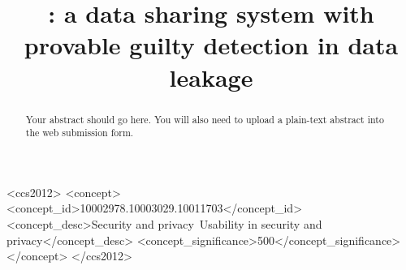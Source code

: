 \documentclass[sigconf, anonymous]{acmart}
\begin{document}
\title{\name: a data sharing system with provable guilty detection in data leakage} %

\begin{abstract}
Your abstract should go here. You will also need to upload a plain-text abstract into the web submission form.
\end{abstract}

\begin{CCSXML}
<ccs2012>
<concept>
<concept_id>10002978.10003029.10011703</concept_id>
<concept_desc>Security and privacy~Usability in security and privacy</concept_desc>
<concept_significance>500</concept_significance>
</concept>
</ccs2012>
\end{CCSXML}



\maketitle















\end{document}
